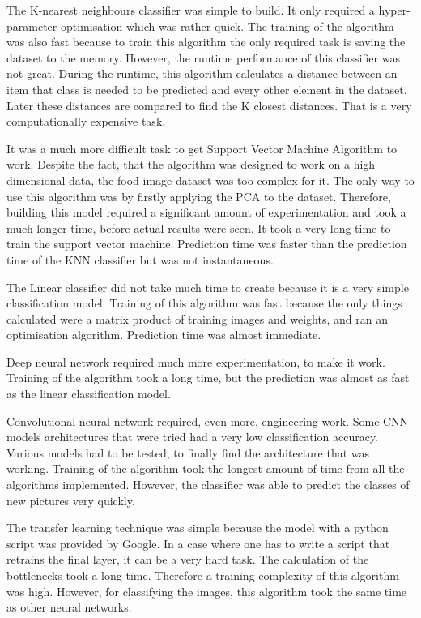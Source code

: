 The K-nearest neighbours classifier was simple to build.  It only required a hyper-parameter optimisation which was rather quick. The training of the algorithm was also fast because to train this algorithm the only required task is saving the dataset to the memory. However, the runtime performance of this classifier was not great. During the runtime, this algorithm calculates a distance between an item that class is needed to be predicted and every other element in the dataset. Later these distances are compared to find the K closest distances. That is a very computationally expensive task.

It was a much more difficult task to get Support Vector Machine Algorithm to work. Despite the fact, that the algorithm was designed to work on a high dimensional data,  the food image dataset was too complex for it. The only way to use this algorithm was by firstly applying the PCA to the dataset. Therefore, building this model required a significant amount of experimentation and took a much longer time, before actual results were seen. It took a very long time to train the support vector machine. Prediction time was faster than the prediction time of the KNN classifier but was not instantaneous.

The Linear classifier did not take much time to create because it is a very simple classification model. Training of this algorithm was fast because the only things calculated were a matrix product of training images and weights, and ran an optimisation algorithm. Prediction time was almost immediate.

Deep neural network required much more experimentation, to make it work. Training of the algorithm took a long time, but the prediction was almost as fast as the linear classification model.

Convolutional neural network required, even more, engineering work. Some CNN models architectures that were tried had a very low classification accuracy. Various models had to be tested, to finally find the architecture that was working.  Training of the algorithm took the longest amount of time from all the algorithms implemented. However, the classifier was able to predict the classes of new pictures very quickly.

The transfer learning technique was simple because the model with a python script was provided by Google. In a case where one has to write a script that retrains the final layer,  it can be a very hard task. The calculation of the bottlenecks took a long time. Therefore a training complexity of this algorithm was high.  However, for classifying the images, this algorithm took the same time as other neural networks.

